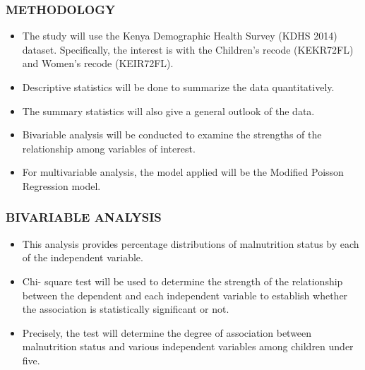 \begin{frame}
\frametitle{METHODOLOGY}
\begin{itemize}
	\item The study will use the Kenya Demographic Health Survey (KDHS 2014) dataset. Specifically, the interest is with the Children’s recode (KEKR72FL) and Women’s recode (KEIR72FL).
	\item Descriptive statistics will be done to summarize the data quantitatively.
	\item The summary statistics will also give a general outlook of the data. 
	\item Bivariable analysis will be conducted to examine the strengths of the relationship among variables of interest.
	\item For multivariable analysis, the model applied will be the Modified Poisson Regression model. 
\end{itemize}
\end{frame}
\begin{frame}
\frametitle{BIVARIABLE ANALYSIS}
\begin{itemize}
	\item This analysis provides percentage distributions of malnutrition status by each of the independent variable. 
	\item Chi- square test will be used to determine the strength of the relationship between the dependent and each independent variable to establish whether the association is statistically significant or not. 
	\item Precisely, the test will determine the degree of association between malnutrition status and various independent variables among children under five. 
	
\end{itemize}
\end{frame}
